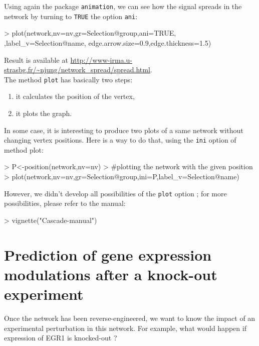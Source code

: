 \documentclass[a4paper]{article}
\begin{document}
Using again the package \texttt{animation}, we can see how the signal spreads in the network by turning to \texttt{TRUE} the option \texttt{ani}:

\begin{Schunk}
\begin{Sinput}
> plot(network,nv=nv,gr=Selection@group,ani=TRUE,
   ,label_v=Selection@name,
   edge.arrow.size=0.9,edge.thickness=1.5)
\end{Sinput}
\end{Schunk}

Result is available at \url{http://www-irma.u-strasbg.fr/~njung/network_spread/spread.html}. \\


The method \texttt{plot} has basically two steps: 

\begin{enumerate}
\item it calculates the position of the vertex,
\item  it plots the graph.
\end{enumerate} 

In some case, it is interesting to produce two plots of a same network without changing vertex positions. Here is a way to do that, using the \texttt{ini} option of method plot:

\begin{Schunk}
\begin{Sinput}
> P<-position(network,nv=nv)
> #plotting the network with the given position
> plot(network,nv=nv,gr=Selection@group,ini=P,label_v=Selection@name)
\end{Sinput}
\end{Schunk}

 
However, we didn't develop all possibilities of the \texttt{plot} option ; for more possibilities, please refer to the manual:

\begin{Schunk}
\begin{Sinput}
> vignette("Cascade-manual")
\end{Sinput}
\end{Schunk}



\section{Prediction of gene expression modulations after a knock-out experiment}

Once the network has been reverse-engineered, we want to know the impact of an experimental perturbation in this network. For example, what would happen if expression of EGR1 is knocked-out ?
\end{document}
